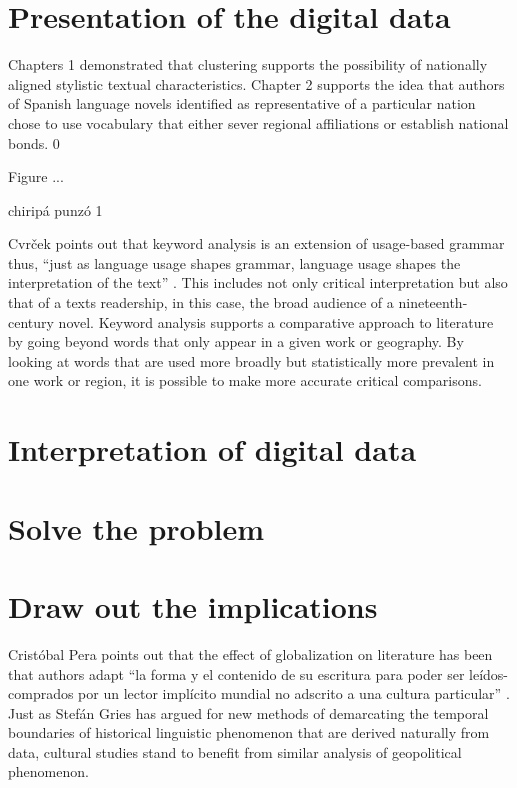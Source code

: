 \documentclass[12pt]{report}
\begin{document}
\section{Presentation of the digital data}
Chapters 1 demonstrated that clustering supports the possibility of nationally aligned stylistic textual characteristics. Chapter 2 supports the idea that authors of Spanish language novels identified as representative of a particular nation chose to use vocabulary that either sever regional affiliations or establish national bonds.
0

Figure ...


chiripá punzó	1

Cvrček points out that keyword analysis is an extension of usage-based grammar thus, \enquote{just as language usage shapes grammar, language usage shapes the interpretation of the text} \autocite{Cvrcek https://www.aatseel.org/100111/pdf/4a8_3_cvrek.pdf}. 
This includes not only critical interpretation but also that of a texts readership, in this case, the broad audience of a nineteenth-century novel.
Keyword analysis supports a comparative approach to literature by going beyond words that only appear in a given work or geography.
By looking at words that are used more broadly but statistically more prevalent in one work or region, it is possible to make more accurate critical comparisons.

\section{Interpretation of digital data}




\section{Solve the problem}





\section{Draw out the implications}
Cristóbal Pera points out that the effect of globalization on literature has been that authors adapt \enquote{la forma y el contenido de su escritura para poder ser leídos-comprados por un lector implícito mundial no adscrito a una cultura particular} \autocite*[101]{Pera2012}.
Just as Stefán Gries has argued for new methods of demarcating the temporal boundaries of historical linguistic phenomenon that are derived naturally from data, cultural studies stand to benefit from similar analysis of geopolitical phenomenon. 
\end{document}
